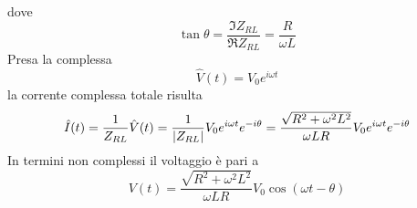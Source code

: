 dove
\begin{equation*}
	\tan\theta=\frac{\Im Z_{RL}}{\Re Z_{RL}}=\frac{R}{\omega L}
\end{equation*}
Presa la \ddp complessa
\begin{equation*}
	\hat{V}(t)=V_0e^{i\omega t}
\end{equation*}
la corrente complessa totale risulta
\begin{equation*}
	\hat{I}(t)=\frac{1}{Z_{RL}}\hat{V}(t)=\frac{1}{\abs{Z_{RL}}}V_0e^{i\omega t}e^{-i\theta}=\frac{\sqrt{R^2+\omega^2L^2}}{\omega L R}V_0e^{i\omega t}e^{-i\theta}
\end{equation*}
In termini non complessi il voltaggio è pari a
\begin{equation*}
	V(t)=\frac{\sqrt{R^2+\omega^2L^2}}{\omega L R}V_0\cos(\omega t -\theta)
\end{equation*}

